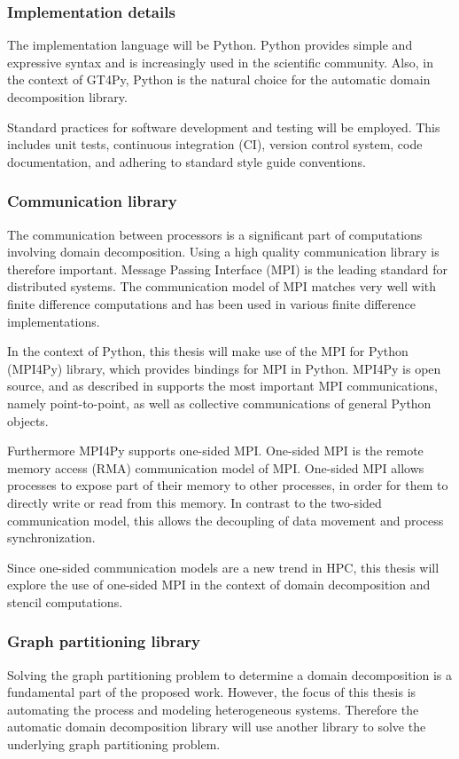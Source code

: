 \subsubsection{Implementation details}
The implementation language will be Python.
Python provides simple and expressive syntax and is increasingly used in the scientific community.
Also, in the context of GT4Py, Python is the natural choice for the automatic domain decomposition library.

Standard practices for software development and testing will be employed.
This includes unit tests, continuous integration (CI), version control system, code documentation, and adhering to standard style guide conventions.

\subsubsection{Communication library}
The communication between processors is a significant part of computations involving domain decomposition.
Using a high quality communication library is therefore important.
Message Passing Interface (MPI) is the leading standard for distributed systems.
The communication model of MPI matches very well with finite difference computations and has been used in various finite difference implementations.

In the context of Python, this thesis will make use of the MPI for Python (MPI4Py) library, which provides bindings for MPI in Python.
MPI4Py is open source, and as described in \cite{dalcin2005mpi} supports the most important MPI communications, namely point-to-point, as well as collective communications of general Python objects.

Furthermore MPI4Py supports one-sided MPI.
One-sided MPI is the remote memory access (RMA) communication model of MPI.
One-sided MPI allows processes to expose part of their memory to other processes, in order for them to directly write or read from this memory.
In contrast to the two-sided communication model, this allows the decoupling of data movement and process synchronization.

Since one-sided communication models are a new trend in HPC, this thesis will explore the use of one-sided MPI in the context of domain decomposition and stencil computations.

\subsubsection{Graph partitioning library}
Solving the graph partitioning problem to determine a domain decomposition is a fundamental part of the proposed work.
However, the focus of this thesis is automating the process and modeling heterogeneous systems.
Therefore the automatic domain decomposition library will use another library to solve the underlying graph partitioning problem.


